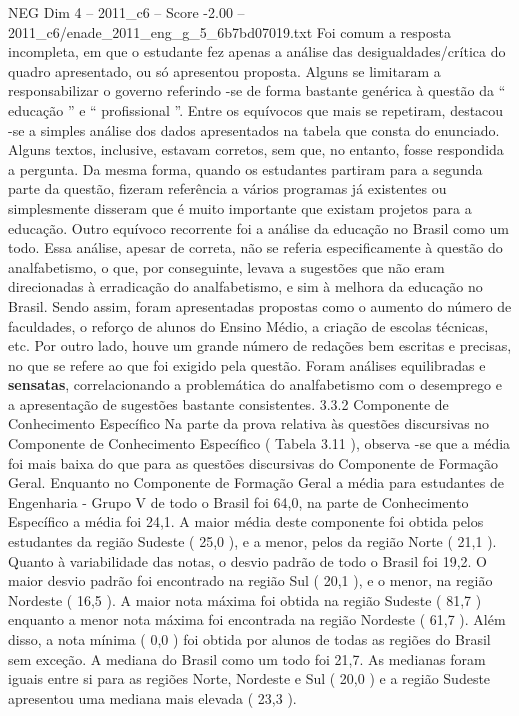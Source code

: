 \begin{textsample}{NEG Dim 4 – 2011\_c6 – Score -2.00 – 2011\_c6/enade\_2011\_eng\_g\_5\_6b7bd07019.txt}
Foi comum a resposta incompleta, em que o estudante fez apenas a análise das desigualdades/crítica do quadro apresentado, ou só apresentou proposta.
Alguns se limitaram a responsabilizar o governo referindo -se de forma bastante genérica à questão da “ educação ” e “ profissional ”.
Entre os equívocos que mais se repetiram, destacou -se a simples análise dos dados apresentados na tabela que consta do enunciado.
Alguns textos, inclusive, estavam corretos, sem que, no entanto, fosse respondida a pergunta.
Da mesma forma, quando os estudantes partiram para a segunda parte da questão, fizeram referência a vários programas já existentes ou simplesmente disseram que é muito importante que existam projetos para a educação.
Outro equívoco recorrente foi a análise da educação no Brasil como um todo.
Essa análise, apesar de correta, não se referia especificamente à questão do analfabetismo, o que, por conseguinte, levava a sugestões que não eram direcionadas à erradicação do analfabetismo, e sim à melhora da educação no Brasil.
Sendo assim, foram apresentadas propostas como o aumento do número de faculdades, o reforço de alunos do Ensino Médio, a criação de escolas técnicas, etc.
Por outro lado, houve um grande número de redações bem escritas e precisas, no que se refere ao que foi exigido pela questão.
Foram análises equilibradas e \textbf{sensatas}, correlacionando a problemática do analfabetismo com o desemprego e a apresentação de sugestões bastante consistentes. 3.3.2 Componente de Conhecimento Específico Na parte da prova relativa às questões discursivas no Componente de Conhecimento Específico ( Tabela 3.11 ), observa -se que a média foi mais baixa do que para as questões discursivas do Componente de Formação Geral.
Enquanto no Componente de Formação Geral a média para estudantes de Engenharia - Grupo V de todo o Brasil foi 64,0, na parte de Conhecimento Específico a média foi 24,1.
A maior média deste componente foi obtida pelos estudantes da região Sudeste ( 25,0 ), e a menor, pelos da região Norte ( 21,1 ).
Quanto à variabilidade das notas, o desvio padrão de todo o Brasil foi 19,2.
O maior desvio padrão foi encontrado na região Sul ( 20,1 ), e o menor, na região Nordeste ( 16,5 ).
A maior nota máxima foi obtida na região Sudeste ( 81,7 ) enquanto a menor nota máxima foi encontrada na região Nordeste ( 61,7 ).
Além disso, a nota mínima ( 0,0 ) foi obtida por alunos de todas as regiões do Brasil sem exceção.
A mediana do Brasil como um todo foi 21,7.
As medianas foram iguais entre si para as regiões Norte, Nordeste e Sul ( 20,0 ) e a região Sudeste apresentou uma mediana mais elevada ( 23,3 ).

\end{textsample}
